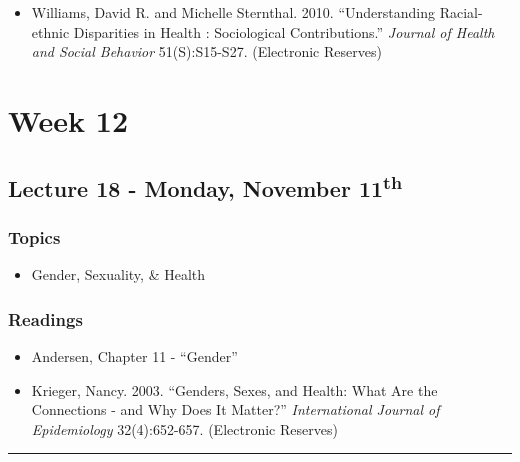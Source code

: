 \documentclass[]{book}
\providecommand{\tightlist}{%
  \setlength{\itemsep}{0pt}\setlength{\parskip}{0pt}}
\begin{document}
\begin{itemize}
\tightlist
\item
  Williams, David R. and Michelle Sternthal. 2010. ``Understanding Racial-ethnic Disparities in Health : Sociological Contributions.'' \emph{Journal of Health and Social Behavior} 51(S):S15-S27. (Electronic Reserves)
\end{itemize}

\hypertarget{week-12}{%
\section*{Week 12}\label{week-12}}

\hypertarget{lecture-18---monday-november-11th}{%
\subsection*{\texorpdfstring{Lecture 18 - Monday, November 11\textsuperscript{th}}{Lecture 18 - Monday, November 11th}}\label{lecture-18---monday-november-11th}}

\hypertarget{topics-22}{%
\subsubsection*{Topics}\label{topics-22}}

\begin{itemize}
\tightlist
\item
  Gender, Sexuality, \& Health
\end{itemize}

\hypertarget{readings-20}{%
\subsubsection*{Readings}\label{readings-20}}

\begin{itemize}
\tightlist
\item
  Andersen, Chapter 11 - ``Gender''
\item
  Krieger, Nancy. 2003. ``Genders, Sexes, and Health: What Are the Connections - and Why Does It Matter?'' \emph{International Journal of Epidemiology} 32(4):652-657. (Electronic Reserves)
\end{itemize}

\begin{center}\rule{0.5\linewidth}{\linethickness}\end{center}
\end{document}
